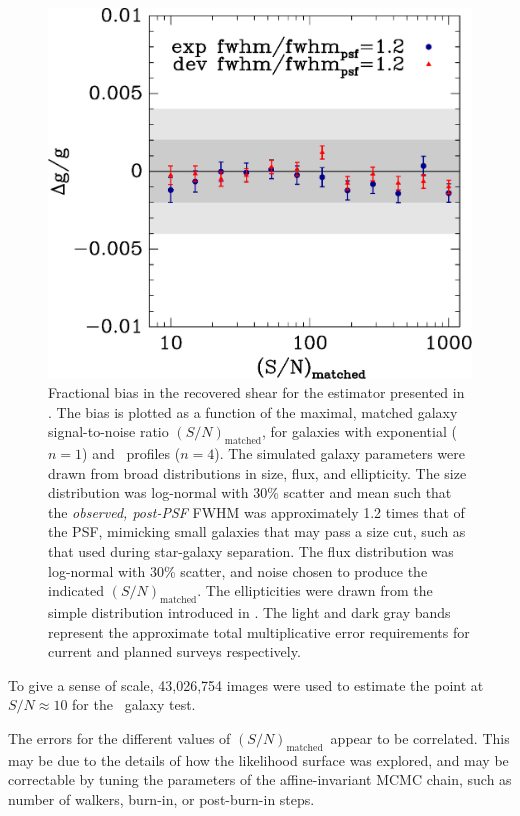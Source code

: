 \documentclass[usegraphicx,usenatbib]{mn2e}
\newcommand{\Msn}{$(S/N)_{\textrm{matched}}$}
\newcommand{\lognormscatt}{30}
\begin{document}
\begin{figure}
 \includegraphics[scale=0.45]{figures/ngmix-fwhm1.2.eps}

 \caption{ Fractional bias in the recovered shear for the estimator presented
     in \citet{ba14}.  The bias is plotted as a function of the maximal,
     matched galaxy signal-to-noise ratio \Msn, for galaxies with exponential
     (\sersic\ $n=1$) and \devauc\ profiles ($n=4$).  The simulated galaxy
     parameters were drawn from broad distributions in size, flux, and
     ellipticity.  The size distribution was log-normal with \lognormscatt\%
     scatter and mean such that the {\it observed, post-PSF} FWHM was
     approximately 1.2 times that of the PSF, mimicking small galaxies that may
     pass a size cut, such as that used during star-galaxy separation.  The
     flux distribution was log-normal with \lognormscatt\% scatter, and noise
 chosen to produce the indicated \Msn.  The ellipticities were drawn from the
 simple distribution introduced in \citet{ba14}. The light and dark gray
 bands represent the approximate total multiplicative error requirements for
 current and planned surveys respectively.}

 \label{fig:fracerr}
\end{figure}

To give a sense of scale, 43,026,754 images were used to estimate the point
at $S/N \approx 10$ for the \devauc\ galaxy test.

The errors for the different values of \Msn\ appear to be correlated.  This may
be due to the details of how the likelihood surface was explored, and may be
correctable by tuning the parameters of the affine-invariant MCMC chain, such
as number of walkers, burn-in, or post-burn-in steps.
\end{document}

